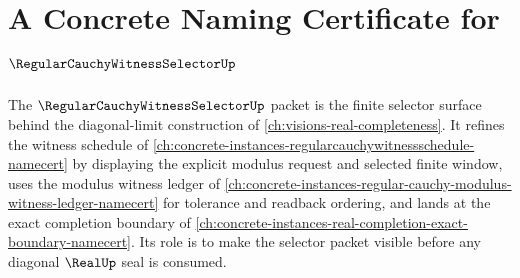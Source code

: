 \chapter{A Concrete Naming Certificate for $\RegularCauchyWitnessSelectorUp$}
\label{ch:concrete-instances-regular-cauchy-witness-selector-namecert}

The $\RegularCauchyWitnessSelectorUp$ packet is the finite selector surface behind the diagonal-limit construction of \autoref{ch:visions-real-completeness}. It refines the witness schedule of \autoref{ch:concrete-instances-regularcauchywitnessschedule-namecert} by displaying the explicit modulus request and selected finite window, uses the modulus witness ledger of \autoref{ch:concrete-instances-regular-cauchy-modulus-witness-ledger-namecert} for tolerance and readback ordering, and lands at the exact completion boundary of \autoref{ch:concrete-instances-real-completion-exact-boundary-namecert}. Its role is to make the selector packet visible before any diagonal $\RealUp$ seal is consumed.



